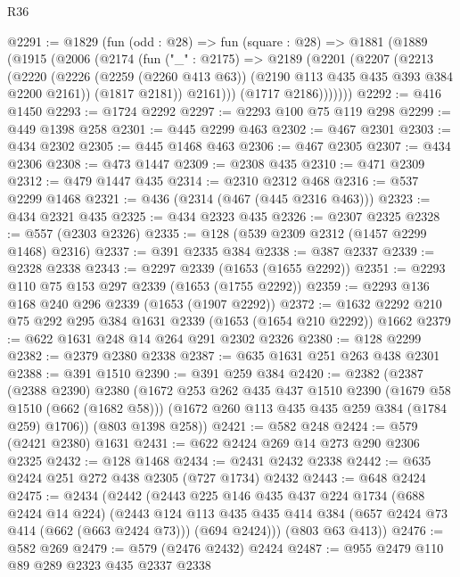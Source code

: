 \begin{lexlean}{R36}
\begin{coremodule}
@2291 := @1829
    (fun (odd : @28) =>
    fun (square : @28) =>
    @1881
      (@1889
        (@1915
          (@2006
            (@2174
              (fun ("_" : @2175) =>
              @2189
                (@2201
                  (@2207
                    (@2213
                      (@2220
                        (@2226
                          (@2259 (@2260 @413 @63))
                          (@2190 @113 @435 @435 @393 @384 @2200 @2161))
                        (@1817 @2181))
                      @2161)))
                (@1717 @2186)))))))
@2292 := @416 @1450
@2293 := @1724 @2292
@2297 := @2293 @100 @75 @119 @298
@2299 := @449 @1398 @258
@2301 := @445 @2299 @463
@2302 := @467 @2301
@2303 := @434 @2302
@2305 := @445 @1468 @463
@2306 := @467 @2305
@2307 := @434 @2306
@2308 := @473 @1447
@2309 := @2308 @435
@2310 := @471 @2309
@2312 := @479 @1447 @435
@2314 := @2310 @2312 @468
@2316 := @537 @2299 @1468
@2321 := @436 (@2314 (@467 (@445 @2316 @463)))
@2323 := @434 @2321 @435
@2325 := @434 @2323 @435
@2326 := @2307 @2325
@2328 := @557 (@2303 @2326)
@2335 := @128 (@539 @2309 @2312 (@1457 @2299 @1468) @2316)
@2337 := @391 @2335 @384
@2338 := @387 @2337
@2339 := @2328 @2338
@2343 := @2297 @2339 (@1653 (@1655 @2292))
@2351 := @2293 @110 @75 @153 @297 @2339 (@1653 (@1755 @2292))
@2359 := @2293 @136 @168 @240 @296 @2339 (@1653 (@1907 @2292))
@2372 := @1632 @2292 @210 @75 @292 @295 @384 @1631 @2339 (@1653 (@1654 @210 @2292)) @1662
@2379 := @622 @1631 @248 @14 @264 @291 @2302 @2326
@2380 := @128 @2299
@2382 := @2379 @2380 @2338
@2387 := @635 @1631 @251 @263 @438 @2301
@2388 := @391 @1510
@2390 := @391 @259 @384
@2420 := @2382
    (@2387
      (@2388 @2390)
      @2380
      (@1672
        @253
        @262
        @435
        @437
        @1510
        @2390
        (@1679 @58 @1510 (@662 (@1682 @58)))
        (@1672 @260 @113 @435 @435 @259 @384 (@1784 @259) @1706))
      (@803 @1398 @258))
@2421 := @582 @248
@2424 := @579 (@2421 @2380) @1631
@2431 := @622 @2424 @269 @14 @273 @290 @2306 @2325
@2432 := @128 @1468
@2434 := @2431 @2432 @2338
@2442 := @635 @2424 @251 @272 @438 @2305 (@727 @1734) @2432
@2443 := @648 @2424
@2475 := @2434
    (@2442
      (@2443
        @225
        @146
        @435
        @437
        @224
        @1734
        (@688 @2424 @14 @224)
        (@2443
          @124
          @113
          @435
          @435
          @414
          @384
          (@657 @2424 @73 @414 (@662 (@663 @2424 @73)))
          (@694 @2424)))
      (@803 @63 @413))
@2476 := @582 @269
@2479 := @579 (@2476 @2432) @2424
@2487 := @955 @2479 @110 @89 @289 @2323 @435 @2337 @2338

\end{coremodule}
\end{lexlean}
